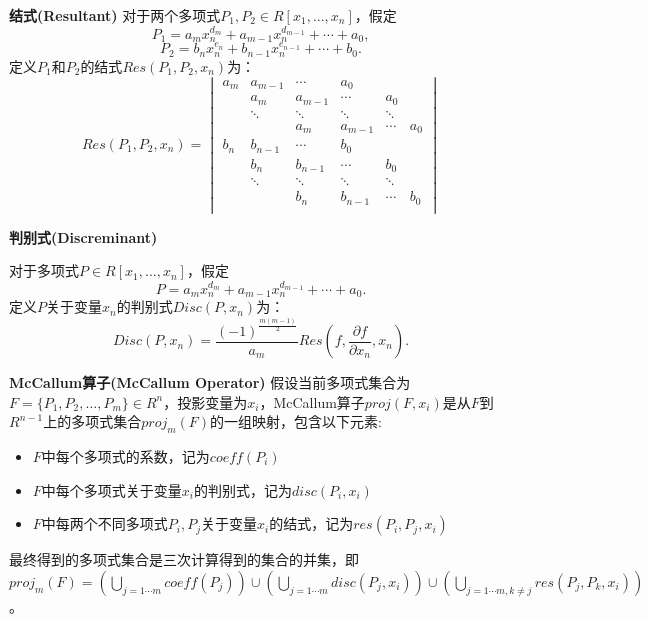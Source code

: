 \begin{definition}{\textbf{结式(Resultant)}}
对于两个多项式$P_1, P_2 \in R[x_1, ..., x_n]$，假定$$
P_1 = a_m x_n^{d_m} + a_{m-1} x_n^{d_{m-1}} + \cdots + a_0,
$$
$$
P_2 = b_n x_n^{e_n} + b_{n-1} x_n^{e_{n-1}} + \cdots + b_0.
$$
定义$P_1$和$P_2$的结式$Res(P_1, P_2, x_n)$为：
$$
Res(P_1, P_2, x_n) = 
\begin{vmatrix}
    a_m & a_{m-1} & \cdots & a_0 \\
    & a_m & a_{m-1} & \cdots & a_0 \\
    & \ddots & \ddots & \ddots & \ddots & \\
    & & a_m & a_{m-1} & \cdots & a_0 \\

    b_n & b_{n-1} & \cdots & b_0 \\
    & b_n & b_{n-1} & \cdots & b_0 \\
    & \ddots & \ddots & \ddots & \ddots & \\
    & & b_n & b_{n-1} & \cdots & b_0 \\
    \end{vmatrix}
$$
\end{definition}

\begin{definition}{\textbf{判别式(Discreminant)}}

对于多项式$P \in R[x_1, ..., x_n]$，假定$$
P = a_m x_n^{d_m} + a_{m-1} x_n^{d_{m-1}} + \cdots + a_0.
$$
定义$P$关于变量$x_n$的判别式$Disc(P, x_n)$为：  
$$
Disc(P, x_n) = \frac{(-1)^{\frac{m(m-1)}{2}}}{a_m} Res(f, \frac{\partial f}{\partial x_n}, x_n). 
$$
\end{definition}

\begin{definition}{\textbf{McCallum算子(McCallum Operator)}}
    假设当前多项式集合为$F = \{P_1, P_2, \dots, P_m\} \in R^n$，投影变量为$x_i$，McCallum算子$proj(F, x_i)$是从$F$到$R^{n-1}$上的多项式集合$proj_m(F)$的一组映射，包含以下元素:
    \begin{itemize}
        \item $F$中每个多项式的系数，记为$coeff(P_i)$
        \item $F$中每个多项式关于变量$x_i$的判别式，记为$disc(P_i, x_i)$
        \item $F$中每两个不同多项式$P_i, P_j$关于变量$x_i$的结式，记为$res(P_i, P_j, x_i)$
    \end{itemize}
    最终得到的多项式集合是三次计算得到的集合的并集，即$proj_m(F) = (\bigcup_{j=1 \cdots m} coeff(P_j)) \cup (\bigcup_{j=1 \cdots m} disc(P_j, x_i)) \cup (\bigcup_{j=1 \cdots m, k \neq j} res(P_j, P_k, x_i))$。
\end{definition}

